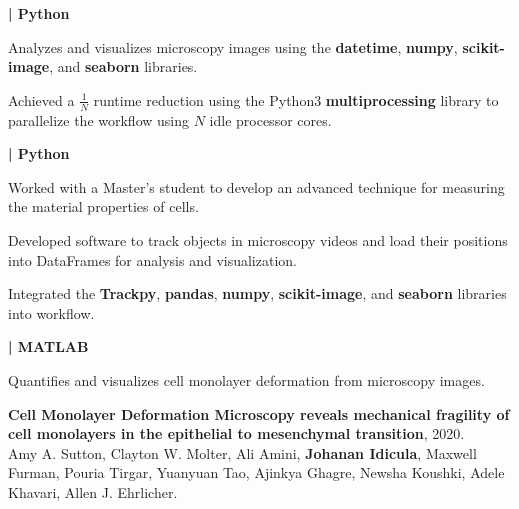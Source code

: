 \documentclass[]{jidicula-resume}
\begin{document}
\textbf{| Python}
\begin{tightemize}
\item Analyzes and visualizes microscopy images using the \textbf{datetime},
  \textbf{numpy}, \textbf{scikit-image}, and \textbf{seaborn} libraries.
\item Achieved a $\frac{1}{N}$ runtime reduction using the Python3 \textbf{multiprocessing} library to parallelize the workflow using $N$ idle processor cores.
\end{tightemize}
\sectionsep{}
\textbf{| Python}
\begin{tightemize}
  
\item Worked with a Master's student to develop an advanced technique for measuring the material properties of cells.

\item Developed software to track objects in microscopy videos and load their
  positions into DataFrames for analysis and visualization.
\item Integrated the \textbf{Trackpy}, \textbf{pandas}, \textbf{numpy},
  \textbf{scikit-image}, and \textbf{seaborn} libraries into workflow.
\end{tightemize}
\sectionsep{}
\textbf{| MATLAB}
\begin{tightemize}
\item Quantifies and visualizes cell monolayer deformation from microscopy
  images.
\item \textbf{Cell Monolayer Deformation Microscopy reveals mechanical fragility of cell monolayers in the epithelial to mesenchymal transition}, 2020.\\
  Amy A. Sutton, Clayton W. Molter, Ali Amini, \textbf{Johanan Idicula},
  Maxwell Furman, Pouria Tirgar, Yuanyuan Tao, Ajinkya Ghagre, Newsha Koushki, Adele Khavari, Allen J. Ehrlicher.

\end{tightemize}
\sectionsep{}

\end{document}
